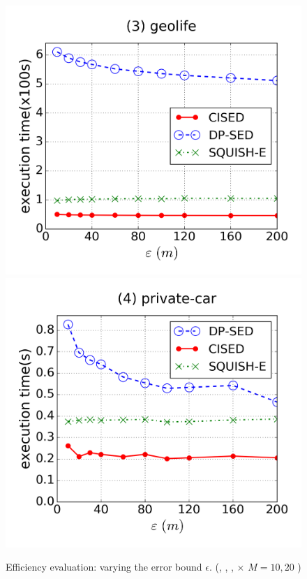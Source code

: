 \begin{figure}[tb!]
\includegraphics[scale = 0.25]{figures/Exp-time-epsilon-geolife.png}
\includegraphics[scale = 0.25]{figures/Exp-time-epsilon-private.png}
\vspace{-3ex}
\caption{\small Efficiency evaluation: varying the error bound $\epsilon$. (\cist, \cista, \dpa, \squishe  $\times$ $M = 10, {20}$ )}
\label{fig:time-epsilon}
\vspace{-1ex}
\end{figure}


